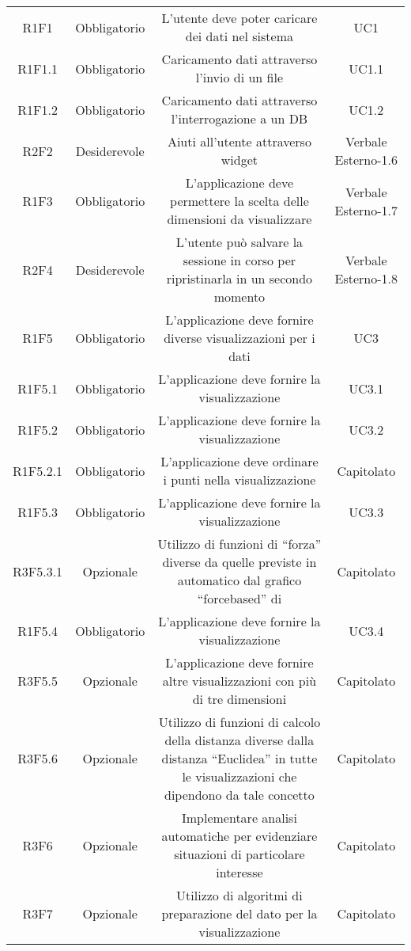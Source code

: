 \begin{center}
\begin{longtable}{C{\colA} C{\colB} C{\colC} C{\colA}}
R1F1 & Obbligatorio & L'utente deve poter caricare dei dati nel sistema & UC1\\
R1F1.1 & Obbligatorio & Caricamento dati attraverso l'invio di un file  & UC1.1\\
R1F1.2 & Obbligatorio & Caricamento dati attraverso l'interrogazione a un DB & UC1.2\\
R2F2 & Desiderevole & Aiuti all'utente attraverso widget & Verbale Esterno-1.6 \\
R1F3 & Obbligatorio & L'applicazione deve permettere la scelta delle dimensioni da visualizzare & Verbale Esterno-1.7\\
R2F4 & Desiderevole & L'utente può salvare la sessione in corso per ripristinarla in un secondo momento & Verbale Esterno-1.8\\
R1F5 & Obbligatorio & L'applicazione deve fornire diverse visualizzazioni per i dati & UC3\\
R1F5.1 & Obbligatorio & L'applicazione deve fornire la visualizzazione  & UC3.1\\
R1F5.2 & Obbligatorio & L'applicazione deve fornire la visualizzazione  & UC3.2\\
R1F5.2.1 & Obbligatorio & L'applicazione deve ordinare i punti nella visualizzazione  & Capitolato \\
R1F5.3 & Obbligatorio & L'applicazione deve fornire la visualizzazione  & UC3.3\\
R3F5.3.1 & Opzionale & Utilizzo di funzioni di “forza” diverse da quelle previste in automatico dal grafico “forcebased” di  & Capitolato\\
R1F5.4 & Obbligatorio & L'applicazione deve fornire la visualizzazione  & UC3.4 \\
R3F5.5 & Opzionale & L'applicazione deve fornire altre visualizzazioni con più di tre dimensioni & Capitolato\\
R3F5.6 & Opzionale & Utilizzo di funzioni di calcolo della distanza diverse dalla distanza “Euclidea” in tutte le visualizzazioni che dipendono da tale concetto & Capitolato \\
R3F6 & Opzionale & Implementare analisi automatiche per evidenziare situazioni di particolare interesse & Capitolato\\
R3F7 & Opzionale & Utilizzo di algoritmi di preparazione del dato per la visualizzazione & Capitolato\\

\end{longtable}
\end{center}
